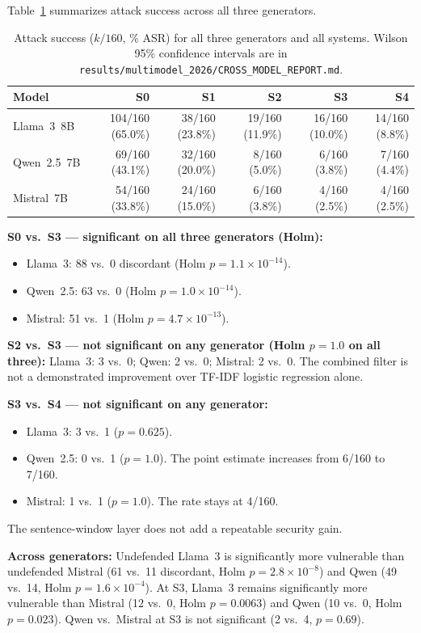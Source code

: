 \documentclass[journal]{IEEEtran}
\begin{document}
Table~\ref{tab:asr_all} summarizes attack success across all three generators.

\begin{table}[!t]
\centering
\caption{Attack success ($k/160$, \% ASR) for all three generators and all
  systems. Wilson 95\% confidence intervals are in
  \texttt{results/multimodel\_2026/CROSS\_MODEL\_REPORT.md}.}
\label{tab:asr_all}
\begin{tabular}{@{}lrrrrr@{}}
\toprule
Model & S0 & S1 & S2 & S3 & S4 \\
\midrule
Llama~3~8B  & 104/160 (65.0\%) & 38/160 (23.8\%) & 19/160 (11.9\%) & 16/160 (10.0\%) & 14/160 (8.8\%) \\
Qwen~2.5~7B & 69/160 (43.1\%)  & 32/160 (20.0\%) & 8/160 (5.0\%)   & 6/160 (3.8\%)   & 7/160 (4.4\%) \\
Mistral~7B  & 54/160 (33.8\%)  & 24/160 (15.0\%) & 6/160 (3.8\%)   & 4/160 (2.5\%)   & 4/160 (2.5\%) \\
\bottomrule
\end{tabular}
\end{table}

\textbf{S0 vs.\ S3 --- significant on all three generators (Holm):}
\begin{itemize}
\item Llama~3: 88 vs.\ 0 discordant (Holm $p = 1.1 \times 10^{-14}$).
\item Qwen~2.5: 63 vs.\ 0 (Holm $p = 1.0 \times 10^{-14}$).
\item Mistral: 51 vs.\ 1 (Holm $p = 4.7 \times 10^{-13}$).
\end{itemize}

\textbf{S2 vs.\ S3 --- not significant on any generator (Holm $p = 1.0$ on all
three):}
Llama~3: 3 vs.\ 0; Qwen: 2 vs.\ 0; Mistral: 2 vs.\ 0. The combined filter is
not a demonstrated improvement over TF-IDF logistic regression alone.

\textbf{S3 vs.\ S4 --- not significant on any generator:}
\begin{itemize}
\item Llama~3: 3 vs.\ 1 ($p = 0.625$).
\item Qwen~2.5: 0 vs.\ 1 ($p = 1.0$). The point estimate increases from 6/160
  to 7/160.
\item Mistral: 1 vs.\ 1 ($p = 1.0$). The rate stays at 4/160.
\end{itemize}
The sentence-window layer does not add a repeatable security gain.

\textbf{Across generators:} Undefended Llama~3 is significantly more vulnerable
than undefended Mistral (61 vs.\ 11 discordant, Holm $p = 2.8 \times 10^{-8}$)
and Qwen (49 vs.\ 14, Holm $p = 1.6 \times 10^{-4}$). At S3, Llama~3 remains
significantly more vulnerable than Mistral (12 vs.\ 0, Holm $p = 0.0063$) and
Qwen (10 vs.\ 0, Holm $p = 0.023$). Qwen vs.\ Mistral at S3 is not significant
(2 vs.\ 4, $p = 0.69$).
\end{document}
